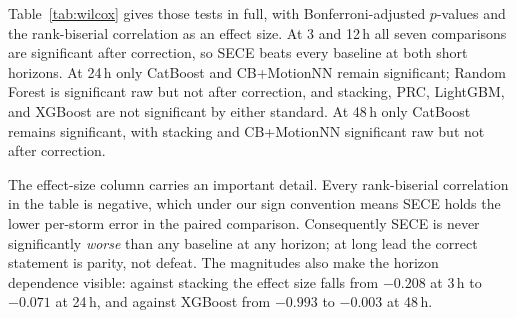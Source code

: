 \documentclass[10pt,twocolumn,a4paper]{article}
\newcommand{\sece}{SECE}
\begin{document}
Table~\ref{tab:wilcox} gives those tests in full, with Bonferroni-adjusted
$p$-values and the rank-biserial correlation as an effect size. At 3 and 12\,h all
seven comparisons are significant after correction, so \sece{} beats every
baseline at both short horizons. At 24\,h only CatBoost and CB+MotionNN remain
significant; Random Forest is significant raw but not after correction, and
stacking, PRC, LightGBM, and XGBoost are not significant by either standard. At
48\,h only CatBoost remains significant, with stacking and CB+MotionNN
significant raw but not after correction.

The effect-size column carries an important detail. Every rank-biserial
correlation in the table is negative, which under our sign convention means
\sece{} holds the lower per-storm error in the paired comparison. Consequently
\sece{} is never significantly \emph{worse} than any baseline at any horizon; at
long lead the correct statement is parity, not defeat. The magnitudes also make
the horizon dependence visible: against stacking the effect size falls from
$-0.208$ at 3\,h to $-0.071$ at 24\,h, and against XGBoost from $-0.993$ to
$-0.003$ at 48\,h.
\end{document}
